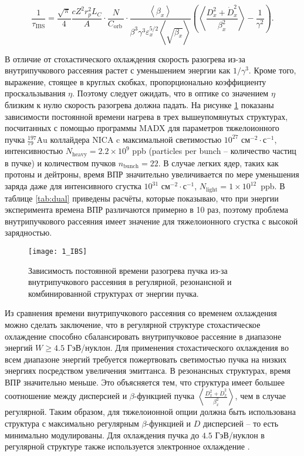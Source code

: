 \begin{equation}
\frac{1}{\tau_{\textrm{IBS}}}=\frac{\sqrt\pi}{4}\frac{cZ^2r_p^2L_C}{A}\cdot\frac{N}{C_{\mathrm{orb\ }}}\cdot\frac{\left\langle\beta_x\right\rangle}{\beta^3\gamma^3\varepsilon_x^{5/2}\left\langle\sqrt{\beta_x}\right\rangle}\left(\left\langle\frac{D_x^2+{\dot{D}}_x^2}{\beta_x^2}\right\rangle-\frac{1}{\gamma^2}\right).
\label{eq:IBS}
\end{equation}

\noindent В отличие от стохастического охлаждения скорость разогрева из-за внутрипучкового рассеяния растет с уменьшением энергии как $1/\gamma^3$. Кроме того, выражение, стоящее в круглых скобках, пропорционально коэффициенту проскальзывания $\eta$. Поэтому следует ожидать, что в оптике со значением $\eta$ близким к нулю скорость разогрева должна падать. На рисунке \ref{fig:1_IBS} показаны зависимости постоянной времени нагрева в трех вышеупомянутых структурах, посчитанных с помощью программы MADX \cite{madx, antoniou:ibs} для параметров тяжелоионного пучка ${_{79}^{197}}\textrm{Au}$ коллайдера NICA c максимальной светимостью ${10}^{27}$ $\text{см}^{-2}\cdot\text{с}^{-1}$, интенсивностью $N_{\text{heavy}} = 2.2\times10^9$ ppb (particles per bunch -- количество частиц в пучке) и количеством пучков $n_{\text{bunch}}=22$. В случае легких ядер, таких как протоны и дейтроны, время ВПР значительно увеличивается по мере уменьшения заряда даже для интенсивного сгустка ${10}^{31}$ $\text{см}^{-2}\cdot\text{с}^{-1}$, $N_{\text{light}} = 1\times10^{12}$~ppb. В таблице \ref{tab:dual} приведены расчёты, которые показываю, что при энергии эксперимента времена ВПР различаются примерно в 10 раз, поэтому проблема внутрипучкового рассеяния имеет значение для тяжелоионного сгустка с высокой зарядностью.

\begin{figure}[!h]
  \centering
   \texttt{[image: 1\_IBS]}
   \caption{Зависимость постоянной времени разогрева пучка из-за внутрипучкового рассеяния в регулярной, резонансной и комбинированной структурах от энергии пучка.}
   \label{fig:1_IBS}
\end{figure}

\noindent Из сравнения времени внутрипучкового рассеяния со временем охлаждения можно сделать заключение, что в регулярной структуре стохастическое охлаждение способно сбалансировать внутрипучковое рассеяние в диапазоне энергий $W\geq4.5$ ГэВ/нуклон. Для применения стохастического охлаждения во всем диапазоне энергий требуется пожертвовать светимостью пучка на низких энергиях посредством увеличения эмиттанса. В резонансных структурах, время ВПР значительно меньше. Это объясняется тем, что структура имеет большее соотношение между дисперсией и $\beta$-функцией пучка $\left\langle\frac{D_x^2+{\dot{D}}_x^2}{\beta_x^2}\right\rangle$, чем в случае регулярной. Таким образом, для тяжелоионной опции должна быть использована структура с максимально регулярным $\beta$-функцией и $D$ дисперсией -- то есть минимально модулированы. Для охлаждения пучка до $4.5$ ГэВ/нуклон в регулярной структуре также используется электронное охлаждение \cite{kostromin:stochastic}.

